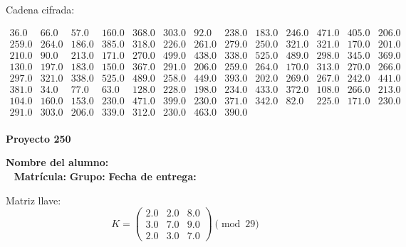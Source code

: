 \documentclass[12pt]{article}
\begin{document}
Cadena cifrada:
\begin{center}
$\begin{array}{lllllllllllll}
36.0 & 66.0 & 57.0 & 160.0 & 368.0 & 303.0 & 92.0 & 238.0 & 183.0 & 246.0 & 471.0 & 405.0 & 206.0\\
259.0 & 264.0 & 186.0 & 385.0 & 318.0 & 226.0 & 261.0 & 279.0 & 250.0 & 321.0 & 321.0 & 170.0 & 201.0\\
210.0 & 90.0 & 213.0 & 171.0 & 270.0 & 499.0 & 438.0 & 338.0 & 525.0 & 489.0 & 298.0 & 345.0 & 369.0\\
130.0 & 197.0 & 183.0 & 150.0 & 367.0 & 291.0 & 206.0 & 259.0 & 264.0 & 170.0 & 313.0 & 270.0 & 266.0\\
297.0 & 321.0 & 338.0 & 525.0 & 489.0 & 258.0 & 449.0 & 393.0 & 202.0 & 269.0 & 267.0 & 242.0 & 441.0\\
381.0 & 34.0 & 77.0 & 63.0 & 128.0 & 228.0 & 198.0 & 234.0 & 433.0 & 372.0 & 108.0 & 266.0 & 213.0\\
104.0 & 160.0 & 153.0 & 230.0 & 471.0 & 399.0 & 230.0 & 371.0 & 342.0 & 82.0 & 225.0 & 171.0 & 230.0\\
291.0 & 303.0 & 206.0 & 339.0 & 312.0 & 230.0 & 463.0 & 390.0\\
\end{array}$
\end{center}

\newpage


\textbf{Proyecto 250}

\textbf{Nombre del alumno:} \underline{\hspace{13cm}}\\\
\vspace{1cm}
\textbf{Matrícula:} \underline{\hspace{4cm}} \hspace{1cm}
\textbf{Grupo:} \underline{\hspace{2cm}}
\textbf{Fecha de entrega:} \underline{\hspace{2cm}}

\medskip

Matriz llave:
\[
K = \begin{pmatrix}
2.0 & 2.0 & 8.0\\
3.0 & 7.0 & 9.0\\
2.0 & 3.0 & 7.0
\end{pmatrix} \pmod{29}
\]
\end{document}
